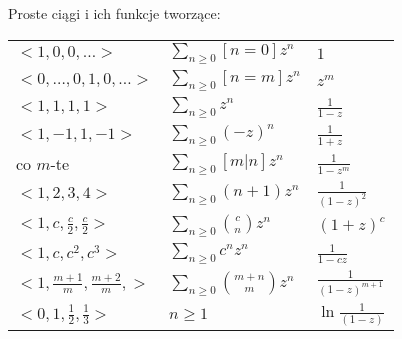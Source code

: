 Proste ciągi i ich funkcje tworzące:
\begin{tabular}{ | l | l | l |  }
    \hline
    $<1,0,0,\dots>$
      & $\sum_{n \geq 0}[n=0] z^n$
      & $1$ \\
    $<0,\dots, 0,1,0,\dots>$
      & $\sum_{n \geq 0}[n=m] z^n$
      & $z^m$ \\
    $<1,1,1,1>$
      & $\sum_{n \geq 0} z^n$
      & $\frac{1}{1-z}$ \\
    $<1,-1,1,-1>$
      & $\sum_{n \geq 0} (-z)^n$
      & $\frac{1}{1+z}$ \\
    co $m$-te
      & $\sum_{n \geq 0} [m | n]z^n$
      & $\frac{1}{1-z^m}$ \\
    $<1,2,3,4>$
      & $\sum_{n \geq 0} (n+1)z^n$
      & $\frac{1}{(1-z)^2}$ \\
    $<1,c,\frac{c}{2},\frac{c}{2}>$
      & $\sum_{n \geq 0} \binom{c}{n}z^n$
      & $(1+z)^c$ \\
    $<1,c,c^2,c^3>$
      & $\sum_{n \geq 0} c^n z^n$
      & $\frac{1}{1-cz}$ \\
    $<1,\frac{m+1}{m},\frac{m+2}{m},>$
      & $\sum_{n \geq 0} \binom{m+n}{m} z^n$
      & $ \frac{1}{(1-z)^{m+1}}$ \\
    $<0,1,\frac{1}{2},\frac{1}{3}>$
      & $n \geq 1$
      & $\ln \frac{1}{(1-z)}$ \\
    \hline
\end{tabular}
